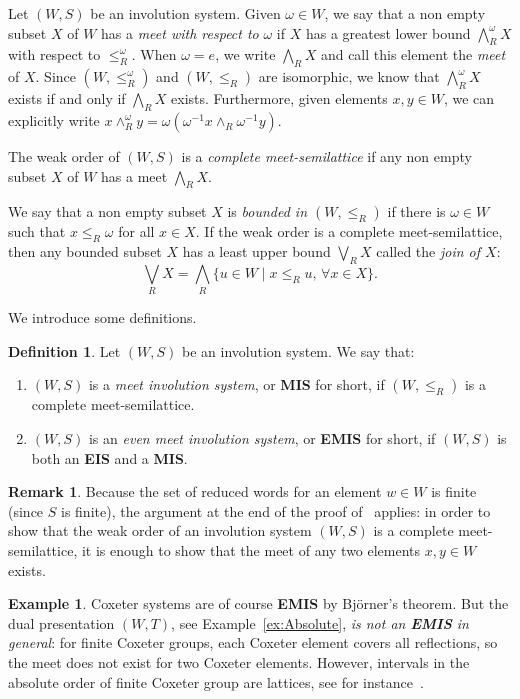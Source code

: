 \documentclass[A4paper, oneside]{amsart}
\newcommand{\id}{\textit{e}}
\newcommand{\EIS}{\textnormal{\bf EIS}\xspace}
\newcommand{\EMIS}{\textnormal{\bf EMIS}\xspace}
\newcommand{\MIS}{\textnormal{\bf MIS}\xspace}
\theoremstyle{definition}
\newtheorem{rem}[thm]{Remark}
\newtheorem{defi}[thm]{Definition}
\newtheorem{ex}[thm]{Example}
\begin{document}
Let $(W,S)$ be an involution system.  Given $\omega \in W$, we say that a non empty subset  $X$ of $W$ has a \emph{meet with respect to} $\omega$ if $X$ has a greatest lower bound $\bigwedge_R^{\omega} X$ with respect to $\leq_R^\omega$. When $\omega=\id$, we write $\bigwedge_R X$ and call this element the \emph{meet} of $X$. Since $(W, \leq_R^{\omega})$ and $(W, \leq_R)$ are isomorphic, we know that $\bigwedge_R^{\omega} X$ exists if and only if $\bigwedge_R X$ exists. Furthermore, given elements $x,y \in W$, we can explicitly write $x \wedge_R^{\omega} y = \omega(\omega^{-1}x \wedge_R \omega^{-1}y)$. 

The weak order of $(W,S)$ is a {\em complete meet-semilattice} if any non empty subset  $X$ of $W$ has a meet $\bigwedge_R X$. 

We say that a non empty subset $X$ is {\em bounded in $(W,\leq_R)$} if there is $\omega\in W$ such that $x\leq_R \omega$ for all $x\in X$. If the weak order is a complete meet-semilattice, then any bounded subset $X$ has a least upper bound $\bigvee_R X$ called the {\em join of $X$}:
$$
\bigvee_R X=\bigwedge_R\{u\in W\mid x\leq_R u,\,\forall x \in X\}.
$$

\smallskip

 We introduce some definitions.

\begin{defi}\label{def:Main} Let $(W,S)$ be an involution system. We say that:
\begin{enumerate}
\item $(W,S)$ is a {\em meet involution system}, or \MIS for short, if $(W,\leq_R)$ is a complete meet-semilattice.
\item $(W,S)$ is an {\em even meet involution system}, or \EMIS for short, if $(W,S)$ is both an \EIS and a \MIS.
\end{enumerate}
\end{defi}



\begin{rem}\label{rem:Complete} Because the set of reduced words for an element $w\in W$ is finite (since $S$ is finite), the argument at the end of the proof of~\cite[Theorem~3.2.1]{BjBr05} applies: in order to show that the weak order of an involution system $(W,S)$ is a complete meet-semilattice, it is enough to show that the meet of any two elements $x,y\in W$ exists.  
\end{rem}

\begin{ex} Coxeter systems are of course \EMIS by Bj\"orner's theorem.  But the dual presentation $(W,T)$, see Example~\ref{ex:Absolute}, {\em is not an \EMIS in general}: for finite Coxeter groups, each Coxeter element covers all reflections, so the meet does not exist for two Coxeter elements. However, intervals in the absolute order of finite Coxeter group are lattices, see for instance~\cite{Be03,BrWa08}.
\end{ex}
\end{document}
